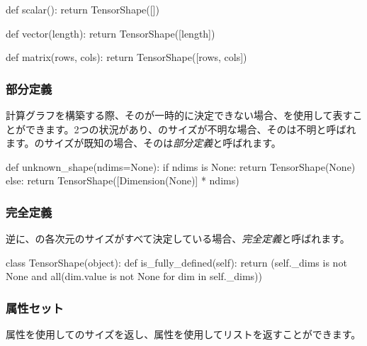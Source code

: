 \begin{content}
\begin{leftbar}
\begin{python}
def scalar():
  return TensorShape([])

def vector(length):
  return TensorShape([length])

def matrix(rows, cols):
  return TensorShape([rows, cols])
\end{python}
\end{leftbar}

\subsubsection{部分定義}

計算グラフを構築する際、そのが一時的に決定できない場合、を使用して表すことができます。2つの状況があり、のサイズが不明な場合、そのは不明と呼ばれます。のサイズが既知の場合、そのは\emph{部分定義}と呼ばれます。

\begin{leftbar}
\begin{python}
def unknown_shape(ndims=None):
  if ndims is None:
    return TensorShape(None)
  else:
    return TensorShape([Dimension(None)] * ndims)
\end{python}
\end{leftbar}

\subsubsection{完全定義}

逆に、の各次元のサイズがすべて決定している場合、\emph{完全定義}と呼ばれます。

\begin{leftbar}
\begin{python}
class TensorShape(object):
  def is_fully_defined(self):
    return (self._dims is not None and all(dim.value is not None
                                           for dim in self._dims))
\end{python}
\end{leftbar}

\subsubsection{属性セット}

属性を使用してのサイズを返し、属性を使用してリストを返すことができます。


\end{content}
